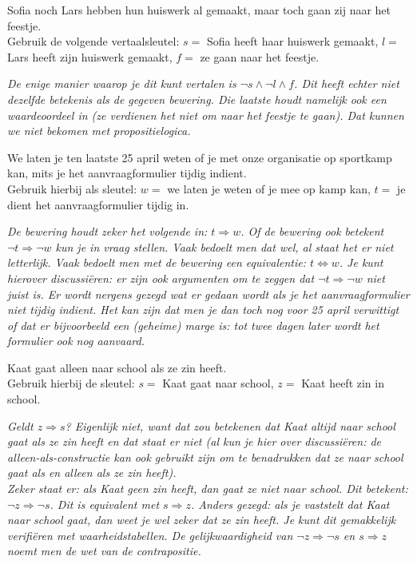 \begin{werktekstoef}
\item{Sofia noch Lars hebben hun huiswerk al gemaakt, maar toch gaan zij naar het feestje.\\ Gebruik de volgende vertaalsleutel: $s=$ Sofia heeft haar huiswerk gemaakt, $l=$ Lars heeft zijn huiswerk gemaakt, $f=$ ze gaan naar het feestje.}

\emph{De enige manier waarop je dit kunt vertalen is $\lnot s \land \lnot l \land f$. Dit heeft echter niet dezelfde betekenis als de gegeven bewering. Die laatste houdt namelijk ook een waardeoordeel in (ze verdienen het niet om  naar het feestje te gaan). Dat kunnen we niet bekomen met propositielogica. %
}


\item{We laten je ten laatste 25 april weten of je met onze organisatie op sportkamp kan, mits je het aanvraagformulier tijdig indient.\\ Gebruik hierbij als sleutel: $w=$ we laten je weten of je mee op kamp kan, $t=$ je dient het aanvraagformulier tijdig in.}

\emph{De bewering houdt zeker het volgende in: $t\Rightarrow w$. Of de bewering ook betekent $\lnot t \Rightarrow \lnot w$ kun je in vraag stellen. Vaak bedoelt men dat wel, al staat het er niet letterlijk. Vaak bedoelt men met de bewering een equivalentie: $t\Leftrightarrow w$. Je kunt hierover discussiëren: er zijn ook argumenten om te zeggen dat $\lnot t \Rightarrow \lnot w$ niet juist is. Er wordt nergens gezegd wat er gedaan wordt als je het aanvraagformulier niet tijdig indient. Het kan zijn dat men je dan toch nog voor 25 april verwittigt of dat er bijvoorbeeld een (geheime) marge is: tot twee dagen later wordt het formulier ook nog aanvaard.}

\item{Kaat gaat alleen naar school als ze zin heeft.\\ Gebruik hierbij de sleutel: $s=$ Kaat gaat naar school, $z=$ Kaat heeft zin in school.}

\emph{Geldt $z \Rightarrow s$? Eigenlijk niet, want dat zou betekenen dat Kaat altijd naar school gaat als ze zin heeft en dat staat er niet (al kun je hier over discussiëren: de alleen-als-constructie kan ook gebruikt zijn om te benadrukken dat ze naar school gaat als en alleen als ze zin heeft).\\ Zeker staat er: als Kaat geen zin heeft, dan gaat ze niet naar school. Dit betekent: $\lnot z \Rightarrow \lnot s$. Dit is equivalent met $s\Rightarrow z$. Anders gezegd: als je vaststelt dat Kaat naar school gaat, dan weet je wel zeker dat ze zin heeft. Je kunt dit gemakkelijk verifiëren met waarheidstabellen. De gelijkwaardigheid van $\lnot z \Rightarrow \lnot s$ en $s\Rightarrow z$ noemt men de wet van de contrapositie.}



\end{werktekstoef}
